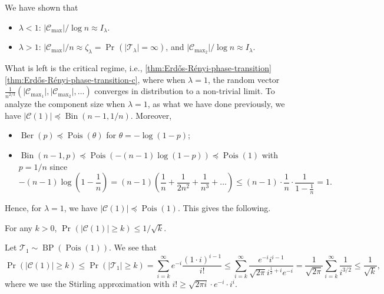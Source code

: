 \begin{prev}
	We have shown that
	\begin{itemize}
		\item \(\lambda < 1\): \(\lvert \mathcal{C} _{\max } \rvert / \log n \approx I_\lambda \).
		\item \(\lambda > 1\): \(\lvert \mathcal{C} _{\max } \rvert / n \approx \zeta _\lambda = \Pr_{}(\lvert \mathcal{T} _{\lambda } \rvert = \infty ) \), and \(\lvert \mathcal{C} _{\max _2} \rvert / \log n \approx I_\lambda \).
	\end{itemize}
\end{prev}

What is left is the critical regime, i.e., \autoref{thm:Erdős-Rényi-phase-transition} \autoref{thm:Erdős-Rényi-phase-transition-c}, where when \(\lambda = 1\), the random vector \(\frac{1}{n^{2 / 3}} (\lvert \mathcal{C} _{\max _1} \rvert , \lvert \mathcal{C} _{\max _2} \rvert , \dots )\) converges in distribution to a non-trivial limit. To analyze the component size when \(\lambda = 1\), as what we have done previously, we have \(\lvert \mathcal{C} (1) \rvert \preceq \operatorname{Bin}(n-1, 1 / n) \). Moreover,
\begin{itemize}
	\item \(\operatorname{Ber}(p) \preceq \operatorname{Pois}(\theta ) \) for \(\theta = - \log (1 - p)\);
	\item \(\operatorname{Bin}(n-1, p) \preceq \operatorname{Pois}(- (n-1) \log (1 - p)) \preceq \operatorname{Pois}(1) \) with \(p = 1 / n\) since
	      \[
		      - (n-1) \log \left( 1 - \frac{1}{n} \right)
		      = (n-1) \left( \frac{1}{n} + \frac{1}{2n^2} + \frac{1}{n^3} + \dots \right)
		      \leq (n-1) \cdot \frac{1}{n} \cdot \frac{1}{1-\frac{1}{n}}
		      = 1.
	      \]
\end{itemize}
Hence, for \(\lambda = 1\), we have \(\lvert \mathcal{C} (1) \rvert \preceq \operatorname{Pois}(1) \). This gives the following.

\begin{claim}
	For any \(k > 0\), \(\Pr_{}(\lvert \mathcal{C} (1) \rvert \geq k) \leq 1 / \sqrt{k} \).
\end{claim}
\begin{explanation}
	Let \(\mathcal{T} _1 \sim \operatorname{BP}(\operatorname{Pois}(1) ) \). We see that
	\[
		\Pr_{}(\lvert \mathcal{C} (1) \rvert \geq k)
		\leq \Pr_{}(\lvert \mathcal{T} _1 \rvert \geq k)
		= \sum_{i=k}^{\infty} e^{-i} \frac{(1 \cdot i)^{i-1}}{i!}
		\leq \sum_{i=k}^{\infty} \frac{e^{-i} i^{i-1}}{\sqrt{2\pi } i^{\frac{1}{2} + i} e^{-i}}
		= \frac{1}{\sqrt{2\pi } } \sum_{i=k}^{\infty} \frac{1}{i^{3 / 2}}
		\leq \frac{1}{\sqrt{k} },
	\]
	where we use the Stirling approximation with \(i! \geq \sqrt{2 \pi i} \cdot e^{-i} \cdot i^i\).
\end{explanation}

